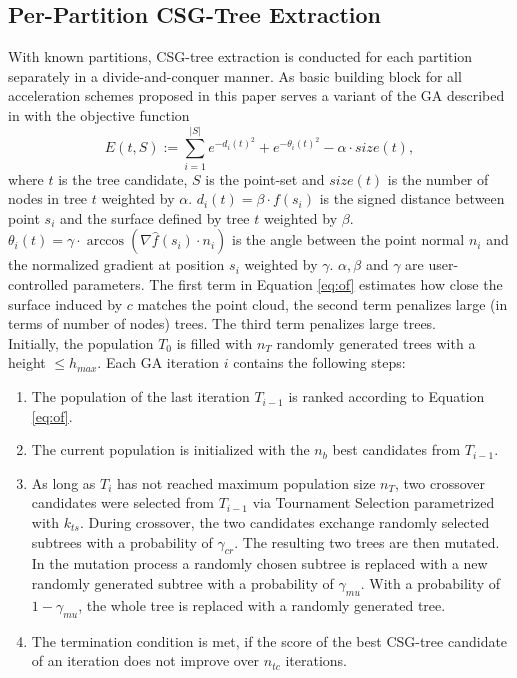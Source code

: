 \subsection{Per-Partition \ac{CSG}-Tree Extraction}
\label{ch:ga}
With known partitions, \ac{CSG}-tree extraction is conducted for each partition separately in a divide-and-conquer manner.
As basic building block for all acceleration schemes proposed in this paper serves a variant of the \ac{GA} described in \cite{fayolle2016evolutionary} with the objective function
\begin{equation}
\label{eq:of}
E(t, S) := \sum_{i=1}^{|S|}{e^{-d_i(t)^2}+e^{-\theta_i(t)^2}}-\alpha \cdot size(t),
\end{equation}
where $t$ is the tree candidate, $S$ is the point-set and $size(t)$ is the number of nodes in tree $t$ weighted by $\alpha$.
$d_i(t) = \beta \cdot f(s_i)$ is the signed distance between point $s_i$ and the surface defined by tree $t$ weighted by $\beta$.
$\theta_i(t) = \gamma \cdot  \arccos(\nabla \hat{f}(s_i) \cdot n_i)$ is the angle between the point normal $n_i$ and the normalized gradient at position $s_i$ weighted by $\gamma$.  
$\alpha, \beta$ and $\gamma$ are user-controlled parameters. 
The first term in Equation \ref{eq:of} estimates how close the surface induced by $c$ matches the point cloud, the second term penalizes large (in terms of number of nodes) trees.
The third term penalizes large trees.
\\
Initially, the population $T_0$ is filled with $n_T$ randomly generated trees with a height $\le h_{max}$. 
Each \ac{GA} iteration $i$ contains the following steps:
\begin{enumerate}
\item The population of the last iteration $T_{i-1}$ is ranked according to Equation \ref{eq:of}.
\item The current population is initialized with the $n_b$ best candidates from $T_{i-1}$.
\item As long as $T_i$ has not reached maximum population size $n_T$, two crossover candidates were selected from $T_{i-1}$ via Tournament Selection \cite{miller95genetic} parametrized with $k_{ts}$.
During crossover, the two candidates exchange randomly selected subtrees with a probability of $\gamma_{cr}$.
The resulting two trees are then mutated. 
In the mutation process a randomly chosen subtree is replaced with a new randomly generated subtree with a probability of $\gamma_{mu}$.
With a probability of $1-\gamma_{mu}$, the whole tree is replaced with a randomly generated tree.
\item The termination condition is met, if the score of the best \ac{CSG}-tree candidate of an iteration does not improve over $n_{tc}$ iterations.  	 
\end{enumerate}  
